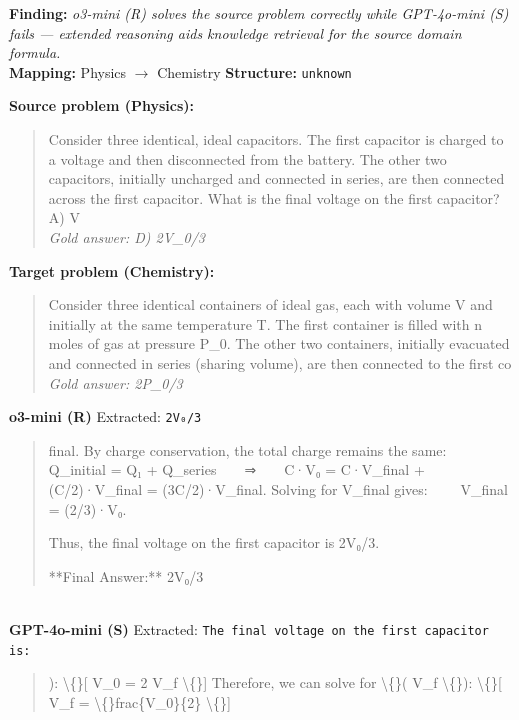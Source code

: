 \begin{tcolorbox}[
  colback=gray!5, colframe=gray!40,
  title={\textbf{Example 3: Reasoning Mode Helps (Source Domain Only)}},
  fonttitle=\small\bfseries, breakable]

\textbf{Finding:} \textit{o3-mini (R) solves the source problem correctly while GPT-4o-mini (S) fails — extended reasoning aids knowledge retrieval for the source domain formula.}
\\[4pt]
\textbf{Mapping:} Physics $\to$ Chemistry \quad
\textbf{Structure:} \texttt{unknown}

\vspace{6pt}
\textbf{Source problem (Physics):}\\
\begin{quote}\small Consider three identical, ideal capacitors. The first capacitor is charged to a voltage and then disconnected from the battery. The other two capacitors, initially uncharged and connected in series, are then connected across the first capacitor. What is the final voltage on the first capacitor?
A) V\\
\textit{Gold answer: D) 2V\_0/3}\end{quote}

\textbf{Target problem (Chemistry):}\\
\begin{quote}\small Consider three identical containers of ideal gas, each with volume V and initially at the same temperature T. The first container is filled with n moles of gas at pressure P\_0. The other two containers, initially evacuated and connected in series (sharing volume), are then connected to the first co\\
\textit{Gold answer: 2P\_0/3}\end{quote}

\vspace{4pt}
\textbf{o3-mini (R)} \textcolor{darkgreen}{\cmark} Extracted: \texttt{2V₀/3}
\begin{quote}\scriptsize\ttfamily [...] final.
By charge conservation, the total charge remains the same:
  Q\_initial = Q₁ + Q\_series  ⇒  C·V₀ = C·V\_final + (C/2)·V\_final = (3C/2)·V\_final.
Solving for V\_final gives:
  V\_final = (2/3)·V₀.

Thus, the final voltage on the first capacitor is 2V₀/3.

**Final Answer:** 2V₀/3\end{quote}
\\[-2pt]
\textbf{GPT-4o-mini (S)} \textcolor{red}{\xmark} Extracted: \texttt{The final voltage on the first capacitor is:}
\begin{quote}\scriptsize\ttfamily [...] ):
   \textbackslash\{\}[
   V\_0 = 2 V\_f
   \textbackslash\{\}]
   Therefore, we can solve for \textbackslash\{\}( V\_f \textbackslash\{\}):
   \textbackslash\{\}[
   V\_f = \textbackslash\{\}frac\{V\_0\}\{2\}
   \textbackslash\{\}]


\end{quote}
\end{tcolorbox}
